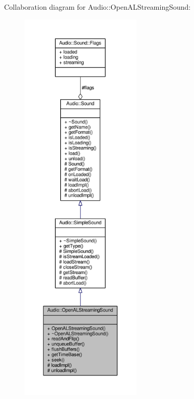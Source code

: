 Collaboration diagram for Audio\+:\+:Open\+A\+L\+Streaming\+Sound\+:
\nopagebreak
\begin{figure}[H]
\begin{center}
\leavevmode
\includegraphics[height=550pt]{d7/dad/classAudio_1_1OpenALStreamingSound__coll__graph}
\end{center}
\end{figure}
